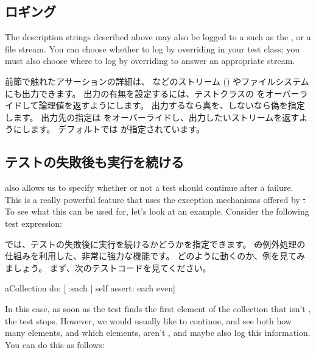\documentclass[a4paper,10pt,twoside]{book}
\begin{document}
\subsection{ロギング}

The description strings described above may also be logged to a
 such as the , or a file stream.
You can choose whether to log by overriding
 in your test class; you must also choose where
to log by overriding  to answer an appropriate stream.
\fi

前節で触れたアサーションの詳細は、  などのストリーム () やファイルシステムにも出力できます。
出力の有無を設定するには、テストクラスの  をオーバーライドして論理値を返すようにします。
出力するなら真を、しないなら偽を指定します。
出力先の指定は  をオーバーライドし、出力したいストリームを返すようにします。
デフォルトでは  が指定されています。

\subsection{テストの失敗後も実行を続ける}

\sunit also allows us to specify whether or not a test should continue after a failure.  This is a really
powerful feature that uses the exception mechanisms offered
by \st.  To see what this can be used for, let's look at an
example. Consider the following test expression:
\fi

\sunit では、テストの失敗後に実行を続けるかどうかを指定できます。
\st の例外処理の仕組みを利用した、非常に強力な機能です。
どのように動くのか、例を見てみましょう。
まず、次のテストコードを見てください。

\begin{code}{}
aCollection do: [ :each | self assert: each even]
\end{code}

In this case, as soon as the test finds the first element of the collection that isn't
, the test stops. 
However, we would usually like to
continue, and see both how many elements, and which elements, aren't
, and maybe also log this information.  You can do this
as follows:
\fi
\end{document}
